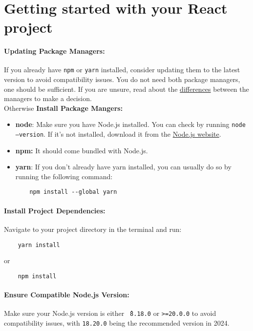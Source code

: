 

\section{Getting started with your React project} \label{sec:react-start}
\paragraph{Updating Package Managers:}  If you already have \texttt{npm} or \texttt{yarn} installed, consider
updating them to the latest version to avoid compatibility issues.
You do not need both package managers, one should be sufficient.
If you are unsure, read about the
\href{https://www.geeksforgeeks.org/node-js/difference-between-npm-and-yarn/}{differences} between the managers to
make a decision. \\
Otherwise \textbf{Install Package Mangers:}     
\begin{itemize}
    \item \textbf{node}: Make sure you have Node.js installed.
    You can check by running \texttt{node --version}.
    If it’s not installed, download it from the \href{https://nodejs.org/}{Node.js website}.
    \item \textbf{npm:} It should come bundled with Node.js.
    \item \textbf{yarn}: If you don't already have yarn installed, you can usually do so by running the following
    command: \begin{verbatim}
    npm install --global yarn
    \end{verbatim}
\end{itemize}

\paragraph{Install Project Dependencies:} Navigate to your project directory in the terminal and run:
\begin{verbatim}
    yarn install
\end{verbatim}
or
\begin{verbatim}
    npm install
\end{verbatim}

\paragraph{Ensure Compatible Node.js Version:} Make sure your Node.js version is either \texttt{\^\ 8.18.0} or \texttt{>=20.0.0} to avoid compatibility issues, with \texttt{18.20.0} being the recommended version in 2024. 
